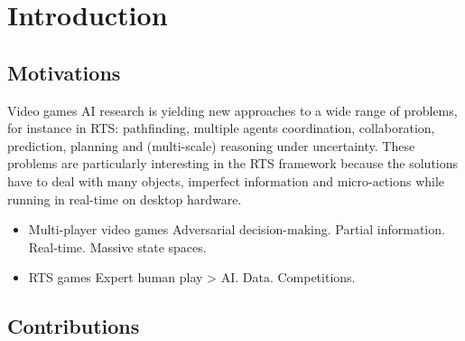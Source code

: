 \chapter{Introduction}


\section{Motivations}

Video games AI research is yielding new approaches to a wide range of problems, for instance in RTS: pathfinding, multiple agents coordination, collaboration, prediction, planning and (multi-scale) reasoning under uncertainty. These problems are particularly interesting in the RTS framework because the solutions have to deal with many objects, imperfect information and micro-actions while running in real-time on desktop hardware.

\begin{itemize}
\item Multi-player video games
Adversarial decision-making. Partial information. Real-time. Massive state spaces.
\item RTS games
Expert human play > AI. Data. Competitions.
\end{itemize}

\section{Contributions}


